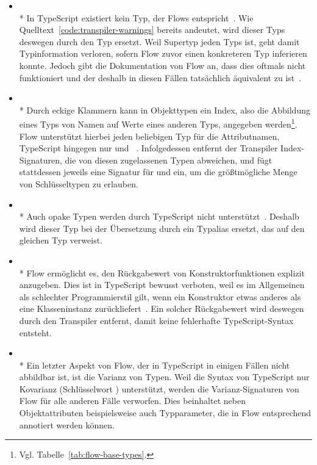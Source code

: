 \begin{itemize}
  \item {}\\*
    In TypeScript existiert kein Typ, der Flows  entspricht~\autocite{TS:GITHUB:NO_EXISTENTIAL_TYPE}. Wie Quelltext~\ref{code:transpiler-warnings} bereits andeutet, wird dieser Typs deswegen durch den Typ  ersetzt. Weil  Supertyp jeden Typs ist, geht damit Typinformation verloren, sofern Flow zuvor einen konkreteren Typ inferieren konnte. Jedoch gibt die Dokumentation von Flow an, dass dies oftmals nicht funktioniert und der  deshalb in diesen Fällen tatsächlich äquivalent zu  ist~\autocite{FLOW:LINT_RULE_REFERENCE}.
  \medbreak
  \item {}\\*
    Durch eckige Klammern kann in Objekttypen ein Index, also die Abbildung eines Typs von Namen auf Werte eines anderen Typs, angegeben werden\footnote{Vgl. Tabelle~\ref{tab:flow-base-types}.}. Flow unterstützt hierbei jeden beliebigen Typ für die Attributnamen, TypeScript hingegen nur  und ~\autocite{TS:HANDBOOK:INTERFACES}. Infolgedessen entfernt der Transpiler Index-Signaturen, die von diesen zugelassenen Typen abweichen, und fügt stattdessen jeweils eine Signatur für  und  ein, um die größtmögliche Menge von Schlüsseltypen zu erlauben.
  \medbreak
  \item {}\\*
    Auch opake Typen werden durch TypeScript nicht unterstützt~\autocite{TS:GITHUB:NO_OPAQUE_TYPE}. Deshalb wird dieser Typ bei der Übersetzung durch ein Typalias ersetzt, das auf den gleichen Typ verweist.
  \medbreak
  \item {}\\*
    Flow ermöglicht es, den Rückgabewert von Konstruktorfunktionen explizit anzugeben. Dies ist in TypeScript bewusst verboten, weil es im Allgemeinen als schlechter Programmierstil gilt, wenn ein Konstruktor etwas anderes als eine Klasseninstanz zurückliefert~\autocite{TS:GITHUB:CONSTRUCTOR_RETURN_TYPE}. Ein solcher Rückgabewert wird deswegen durch den Transpiler entfernt, damit keine fehlerhafte TypeScript-Syntax entsteht.
  \medbreak
  \item {}\\*
    Ein letzter Aspekt von Flow, der in TypeScript in einigen Fällen nicht abbildbar ist, ist die Varianz von Typen. Weil die Syntax von TypeScript nur Kovarianz (Schlüsselwort ) unterstützt, werden die Varianz-Signaturen von Flow für alle anderen Fälle verworfen. Dies beinhaltet neben Objektattributen beispielsweise auch Typparameter, die in Flow entsprechend annotiert werden können.
\end{itemize}

